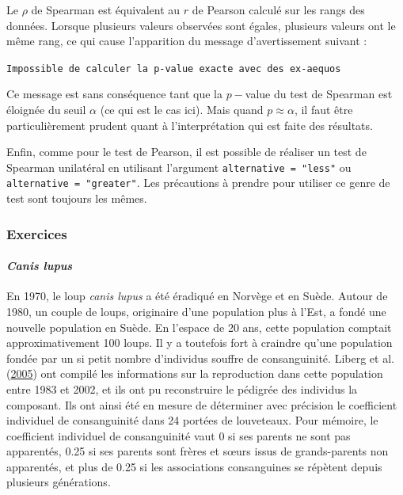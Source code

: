 \documentclass[a4paperpaper,]{article}
\let\oldparagraph\paragraph
\renewcommand{\paragraph}[1]{\oldparagraph{#1}\mbox{}}
\begin{document}
Le \(\rho\) de Spearman est équivalent au \(r\) de Pearson calculé sur les rangs des données. Lorsque plusieurs valeurs observées sont égales, plusieurs valeurs ont le même rang, ce qui cause l'apparition du message d'avertissement suivant :

\texttt{Impossible\ de\ calculer\ la\ p-value\ exacte\ avec\ des\ ex-aequos}

Ce message est sans conséquence tant que la \(p-\)value du test de Spearman est éloignée du seuil \(\alpha\) (ce qui est le cas ici). Mais quand \(p \approx \alpha\), il faut être particulièrement prudent quant à l'interprétation qui est faite des résultats.

Enfin, comme pour le test de Pearson, il est possible de réaliser un test de Spearman unilatéral en utilisant l'argument \texttt{alternative\ =\ "less"} ou \texttt{alternative\ =\ "greater"}. Les précautions à prendre pour utiliser ce genre de test sont toujours les mêmes.

\hypertarget{exercices}{%
\subsubsection{Exercices}\label{exercices}}

\hypertarget{canis-lupus}{%
\paragraph{\texorpdfstring{\emph{Canis lupus}}{Canis lupus}}\label{canis-lupus}}

En 1970, le loup \emph{canis lupus} a été éradiqué en Norvège et en Suède. Autour de 1980, un couple de loups, originaire d'une population plus à l'Est, a fondé une nouvelle population en Suède. En l'espace de 20 ans, cette population comptait approximativement 100 loups. Il y a toutefois fort à craindre qu'une population fondée par un si petit nombre d'individus souffre de consanguinité. Liberg et al. (\protect\hyperlink{ref-liberg2005}{2005}) ont compilé les informations sur la reproduction dans cette population entre 1983 et 2002, et ils ont pu reconstruire le pédigrée des individus la composant. Ils ont ainsi été en mesure de déterminer avec précision le coefficient individuel de consanguinité dans 24 portées de louveteaux.
Pour mémoire, le coefficient individuel de consanguinité vaut 0 si ses parents ne sont pas apparentés, 0.25 si ses parents sont frères et sœurs issus de grands-parents non apparentés, et plus de 0.25 si les associations consanguines se répètent depuis plusieurs générations.
\end{document}
